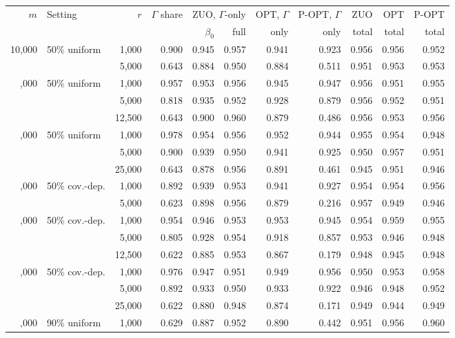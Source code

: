 \begin{tabular}{rlrrrrrrrrr}
\toprule
\(m\) & Setting & \(r\) & \(\Gamma\) share & \multicolumn{2}{c}{ZUO, \(\Gamma\)-only} & OPT, \(\Gamma\) & P-OPT, \(\Gamma\) & ZUO & OPT & P-OPT\\
\cmidrule(lr){5-6}
 & & & & \(\beta_0\) & full & only & only & total & total & total\\
\midrule
10,000 & 50\% uniform & 1,000 & 0.900 & 0.945 & 0.957 & 0.941 & 0.923 & 0.956 & 0.956 & 0.952\\
 &  & 5,000 & 0.643 & 0.884 & 0.950 & 0.884 & 0.511 & 0.951 & 0.953 & 0.953\\
\addlinespace
25,000 & 50\% uniform & 1,000 & 0.957 & 0.953 & 0.956 & 0.945 & 0.947 & 0.956 & 0.951 & 0.955\\
 &  & 5,000 & 0.818 & 0.935 & 0.952 & 0.928 & 0.879 & 0.956 & 0.952 & 0.951\\
 &  & 12,500 & 0.643 & 0.900 & 0.960 & 0.879 & 0.486 & 0.956 & 0.953 & 0.956\\
\addlinespace
50,000 & 50\% uniform & 1,000 & 0.978 & 0.954 & 0.956 & 0.952 & 0.944 & 0.955 & 0.954 & 0.948\\
 &  & 5,000 & 0.900 & 0.939 & 0.950 & 0.941 & 0.925 & 0.950 & 0.957 & 0.951\\
 &  & 25,000 & 0.643 & 0.878 & 0.956 & 0.891 & 0.461 & 0.945 & 0.951 & 0.946\\
\addlinespace
10,000 & 50\% cov.-dep. & 1,000 & 0.892 & 0.939 & 0.953 & 0.941 & 0.927 & 0.954 & 0.954 & 0.956\\
 &  & 5,000 & 0.623 & 0.898 & 0.956 & 0.879 & 0.216 & 0.957 & 0.949 & 0.946\\
\addlinespace
25,000 & 50\% cov.-dep. & 1,000 & 0.954 & 0.946 & 0.953 & 0.953 & 0.945 & 0.954 & 0.959 & 0.955\\
 &  & 5,000 & 0.805 & 0.928 & 0.954 & 0.918 & 0.857 & 0.953 & 0.946 & 0.948\\
 &  & 12,500 & 0.622 & 0.885 & 0.953 & 0.867 & 0.179 & 0.948 & 0.945 & 0.948\\
\addlinespace
50,000 & 50\% cov.-dep. & 1,000 & 0.976 & 0.947 & 0.951 & 0.949 & 0.956 & 0.950 & 0.953 & 0.958\\
 &  & 5,000 & 0.892 & 0.933 & 0.950 & 0.933 & 0.922 & 0.946 & 0.948 & 0.952\\
 &  & 25,000 & 0.622 & 0.880 & 0.948 & 0.874 & 0.171 & 0.949 & 0.944 & 0.949\\
\addlinespace
10,000 & 90\% uniform & 1,000 & 0.629 & 0.887 & 0.952 & 0.890 & 0.442 & 0.951 & 0.956 & 0.960\\

\end{tabular}
